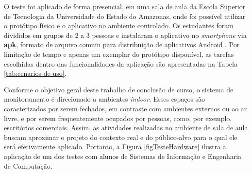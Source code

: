 O teste foi aplicado de forma presencial, em uma sala de aula da Escola Superior de Tecnologia da Universidade do Estado do Amazonas, onde foi possível utilizar o protótipo físico
e o aplicativo no ambiente controlado. Os estudantes foram divididos em grupos de 2 a 3 pessoas e instalaram o 
aplicativo no \textit{smartphone} via \textbf{apk}, formato de arquivo comum para distribuição de aplicativos Android \cite{android-developers}. Por limitação de tempo e apenas um exemplar do protótipo disponível, as 
tarefas escolhidas dentro das funcionalidades da aplicação são apresentadas na Tabela \ref{tab:cenarios-de-uso}. 

Conforme o objetivo geral deste trabalho de conclusão de curso, o sistema de monitoramento é direcionado a ambientes \textit{indoor}. Esses espaços são 
caracterizados por serem fechados, em contraste com ambientes externos ou ao ar livre, e por serem frequentemente ocupados por pessoas, como, por exemplo, escritórios comerciais. Assim, as atividades realizadas no ambiente de sala de aula 
buscam aproximar o projeto do contexto real e do público-alvo para o qual ele será efetivamente aplicado. Portanto, a Figura \ref{figTesteHardware} ilustra a aplicação de um dos testes 
com alunos de Sistemas de Informação e Engenharia de Computação.

